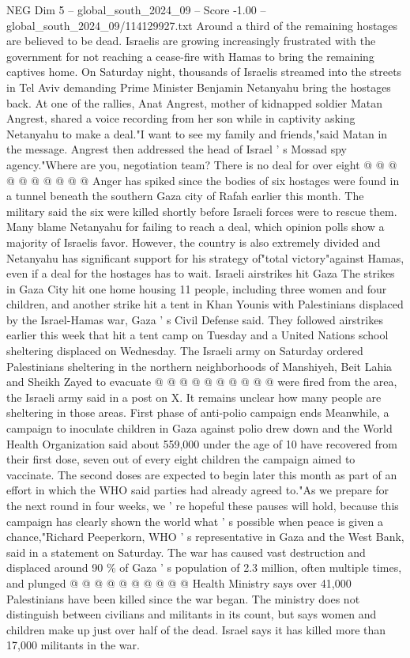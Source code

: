 \begin{textsample}{NEG Dim 5 – global\_south\_2024\_09 – Score -1.00 – global\_south\_2024\_09/114129927.txt}
Around a third of the remaining hostages are believed to be dead.
Israelis are growing increasingly frustrated with the government for not reaching a cease-fire with Hamas to bring the remaining captives home.
On Saturday night, thousands of Israelis streamed into the streets in Tel Aviv demanding Prime Minister Benjamin Netanyahu bring the hostages back.
At one of the rallies, Anat Angrest, mother of kidnapped soldier Matan Angrest, shared a voice recording from her son while in captivity asking Netanyahu to make a deal."I want to see my family and friends,"said Matan in the message.
Angrest then addressed the head of Israel ' s Mossad spy agency."Where are you, negotiation team?
There is no deal for over eight @ @ @ @ @ @ @ @ @ @ Anger has spiked since the bodies of six hostages were found in a tunnel beneath the southern Gaza city of Rafah earlier this month.
The military said the six were killed shortly before Israeli forces were to rescue them.
Many blame Netanyahu for failing to reach a deal, which opinion polls show a majority of Israelis favor.
However, the country is also extremely divided and Netanyahu has significant support for his strategy of"total victory"against Hamas, even if a deal for the hostages has to wait.
Israeli airstrikes hit Gaza The strikes in Gaza City hit one home housing 11 people, including three women and four children, and another strike hit a tent in Khan Younis with Palestinians displaced by the Israel-Hamas war, Gaza ' s Civil Defense said.
They followed airstrikes earlier this week that hit a tent camp on Tuesday and a United Nations school sheltering displaced on Wednesday.
The Israeli army on Saturday ordered Palestinians sheltering in the northern neighborhoods of Manshiyeh, Beit Lahia and Sheikh Zayed to evacuate @ @ @ @ @ @ @ @ @ @ were fired from the area, the Israeli army said in a post on X.
It remains unclear how many people are sheltering in those areas.
First phase of anti-polio campaign ends Meanwhile, a campaign to inoculate children in Gaza against polio drew down and the World Health Organization said about 559,000 under the age of 10 have recovered from their first dose, seven out of every eight children the campaign aimed to vaccinate.
The second doses are expected to begin later this month as part of an effort in which the WHO said parties had already agreed to."As we prepare for the next round in four weeks, we ' re hopeful these pauses will hold, because this campaign has clearly shown the world what ' s possible when peace is given a chance,"Richard Peeperkorn, WHO ' s representative in Gaza and the West Bank, said in a statement on Saturday.
The war has caused vast destruction and displaced around 90 \% of Gaza ' s population of 2.3 million, often multiple times, and plunged @ @ @ @ @ @ @ @ @ @ Health Ministry says over 41,000 Palestinians have been killed since the war began.
The ministry does not distinguish between civilians and militants in its count, but says women and children make up just over half of the dead.
Israel says it has killed more than 17,000 militants in the war.

\end{textsample}
